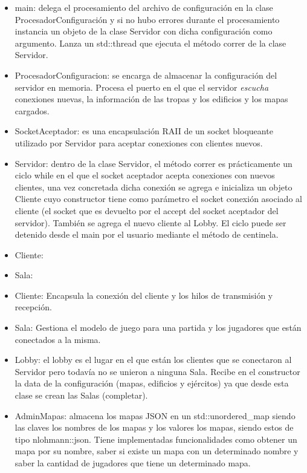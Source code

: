 \documentclass[titlepage,a4paper,12pt]{article}
\begin{document}
\begin{itemize}

\item main: delega el procesamiento del archivo de configuración en la clase ProcesadorConfiguración y si no hubo errores durante el procesamiento instancia un objeto de la clase Servidor con dicha configuración como argumento. Lanza un std::thread que ejecuta el método correr de la clase Servidor.

\item ProcesadorConfiguracion: se encarga de almacenar la configuración del servidor en memoria. Procesa el puerto en el que el servidor \textit{escucha}  conexiones nuevas, la información de las tropas y los edificios y los mapas cargados.

\item SocketAceptador: es una encapsulación RAII de un socket bloqueante utilizado por Servidor para aceptar conexiones con clientes nuevos.

\item Servidor: dentro de la clase Servidor, el método correr es prácticamente un ciclo while en el que el socket aceptador acepta conexiones con nuevos clientes, una vez concretada dicha conexión se agrega e inicializa un objeto Cliente cuyo constructor tiene como parámetro el socket conexión asociado al cliente (el socket que es devuelto por el accept del socket aceptador del servidor). También se agrega el nuevo cliente al Lobby. El ciclo puede ser detenido desde el main por el usuario mediante el método de centinela.

\item Cliente:

\item Sala:
\item Cliente: Encapsula la conexión del cliente y los hilos de transmisión y recepción.

\item Sala: Gestiona el modelo de juego para una partida y los jugadores que están conectados a la misma.

\item Lobby: el lobby es el lugar en el que están los clientes que se conectaron al Servidor pero todavía no se unieron a ninguna Sala. Recibe en el constructor la data de la configuración (mapas, edificios y ejércitos) ya que desde esta clase se crean las Salas (completar).

\item AdminMapas: almacena los mapas JSON en un std::unordered\_map siendo las claves los nombres de los mapas y los valores los mapas, siendo estos de tipo nlohmann::json. Tiene implementadas funcionalidades como obtener un mapa por su nombre, saber si existe un mapa con un determinado nombre y saber la cantidad de jugadores que tiene un determinado mapa.


\end{itemize}
\end{document}
